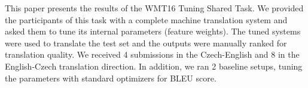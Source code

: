 This paper presents the results of the WMT16 Tuning Shared Task. We provided the participants of this task with a complete machine translation system and asked them to tune its internal parameters (feature weights). The tuned systems were used to translate the test set and the outputs were manually ranked for translation quality. We received 4 submissions in the Czech-English and 8 in the English-Czech translation direction. In addition, we ran 2 baseline setups, tuning the parameters with standard optimizers for BLEU score.
